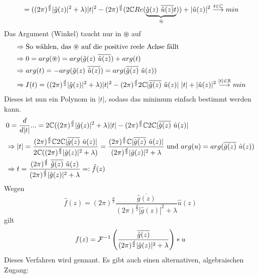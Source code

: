 \begin{enumerate}
\begin{align*}
            &=((2 \pi)^\frac{d}{2} |\hat g(z)|^2 + \lambda)|t|^2 - (2 \pi)^\frac{d}{2} (2 \mathbb{C} Re(\underbrace{\hat g(z) \ \overline{\hat u(z)}t}_{\circledast})) + |\hat u(z)|^2 \overset{t \in \mathbb C}{\longrightarrow} min\\
        \end{align*}
        Das Argument (Winkel) taucht nur in $\circledast$ auf\\
        \begin{align*}
            &\Rightarrow \text{So wählen, das $\circledast$ auf die positive reele Achse fällt}\\
            &\Rightarrow 0=arg(\circledast)= arg(\hat g(z) \ \overline{\hat u(z)}) + arg(t)\\
            &\Rightarrow arg(t)=-arg(\hat g(z) \ \overline{\hat u(z)})=arg(\overline{\hat g(z)} \ \hat u(z))\\
            &\Rightarrow I(t) = ((2\pi)^\frac{d}{2} |\hat g(z)|^2 + \lambda)|t|^2 - (2\pi)^\frac{d}{2} 2 \C |\overline{\hat g(z)} \ \hat u(z)| \ |t| + |\hat u (z)|^2 \overset{|t| \in \R}{\longrightarrow}min
        \end{align*}
        Dieses ist nun ein Polynom in $|t|$, sodass das minimum einfach bestimmt werden kann.\\
        \begin{align*}
            &0=\frac{d}{d|t|}...=2\C((2\pi)^\frac{d}{2}|\hat g(z)|^2 + \lambda)|t| - (2\pi)^\frac{d}{2} \C 2 \C |\overline{\hat g(z)} \ \hat u(z)|\\
            &\Rightarrow |t| = \frac{(2\pi)^\frac{d}{2} \C 2 \C |\overline{\hat g(z)} \ \hat u(z)|}{2\C((2\pi)^\frac{d}{2}|\hat g(z)|^2 + \lambda)} = \frac{(2\pi)^\frac{d}{2}\C |\overline{\hat g(z)} \ \hat u(z)|}{(2\pi)^\frac{d}{2}|\hat g(z)|^2 + \lambda} \text{ und } arg(u)=arg(\overline{\hat g(z)} \ \hat u(z))\\
            &\Rightarrow t =  \frac{(2\pi)^\frac{d}{2} \ \overline{\hat g(z)} \ \hat u(z)}{(2\pi)^\frac{d}{2}|\hat g(z)|^2 + \lambda}=:\hat f(z)
        \end{align*}
        Wegen
        \[\hat f(z) = (2\pi)^\frac{d}{2} \frac{\overline{\hat g(z)}}{(2\pi)^\frac{d}{2}|\hat g(z)|^2 + \lambda} \hat u(z)\]
        gilt
        \begin{equation}
            f(z) = \mathcal{F}^{-1}\left( \frac{\overline{\hat g(z)}}{(2\pi)^\frac{d}{2}|\hat g(z)|^2 + \lambda} \right) * u
        \end{equation}
        Dieses Verfahren wird  gennant.
        Es gibt auch einen alternativen, algebraischen Zugang:
    

\end{enumerate}

